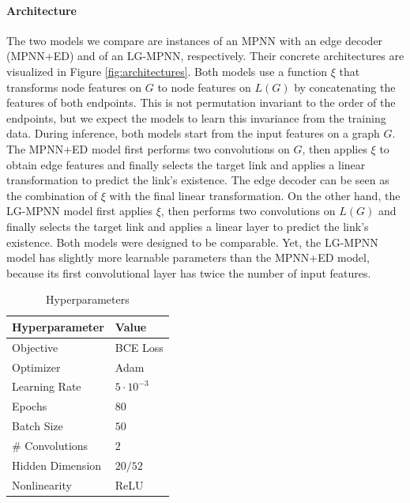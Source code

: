 \documentclass{article}
\begin{document}
\paragraph{Architecture} The two models we compare are instances of an MPNN with an edge decoder (MPNN+ED) and of an LG-MPNN, respectively. Their concrete architectures are visualized in Figure \ref{fig:architectures}.
Both models use a function $\xi$ that transforms node features on $G$ to node features on $L(G)$ by concatenating the features of both endpoints. This is not permutation invariant to the order of the endpoints, but we expect the models to learn this invariance from the training data.
During inference, both models start from the input features on a graph $G$.
The MPNN+ED model first performs two convolutions on $G$, then applies $\xi$ to obtain edge features and finally selects the target link and applies a linear transformation to predict the link's existence. The edge decoder can be seen as the combination of $\xi$ with the final linear transformation.
On the other hand, the LG-MPNN model first applies $\xi$, then performs two convolutions on $L(G)$ and finally selects the target link and applies a linear layer to predict the link's existence.
Both models were designed to be comparable. Yet, the LG-MPNN model has slightly more learnable parameters than the MPNN+ED model, because its first convolutional layer has twice the number of input features.


\begin{table}
    \centering
    \small
    \caption{Hyperparameters}   \label{table:hyperparameters}
    \begin{tabular}{l l}
        \toprule
        \textbf{Hyperparameter} & \textbf{Value} \\
        \midrule
        Objective & BCE Loss \\
        Optimizer & Adam \\
        Learning Rate & $5\cdot10^{-3}$ \\
        Epochs & $80$ \\
        Batch Size & $50$ \\
        \# Convolutions & $2$ \\
        Hidden Dimension & $20/52$ \\
        Nonlinearity & ReLU \\
        \bottomrule
    \end{tabular}
\end{table}
\end{document}
